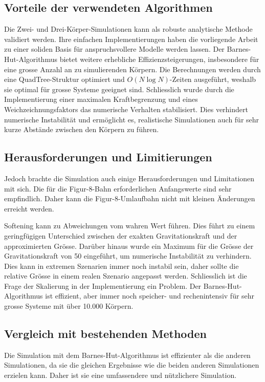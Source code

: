 \documentclass[a4paper,12pt,twoside]{article}
\begin{document}
\subsection{Vorteile der verwendeten Algorithmen}
Die Zwei- und Drei-Körper-Simulationen kann als robuste analytische Methode 
validiert werden. Ihre einfachen Implementierungen haben die vorliegende Arbeit 
zu einer soliden Basis für anspruchsvollere Modelle werden lassen. 
Der Barnes-Hut-Algorithmus bietet weitere erhebliche Effizienzsteigerungen, 
insbesondere für eine grosse Anzahl an zu simulierenden Körpern. 
Die Berechnungen werden durch eine QuadTree-Struktur optimiert 
und $O(N \log N)$-Zeiten ausgeführt, weshalb sie optimal für grosse 
Systeme geeignet sind. Schliesslich wurde durch die Implementierung einer 
maximalen Kraftbegrenzung und eines Weichzeichnungsfaktors das numerische 
Verhalten stabilisiert. Dies verhindert numerische Instabilität und ermöglicht es, 
realistische Simulationen auch für sehr kurze Abstände zwischen den Körpern zu führen. 

\subsection{Herausforderungen und Limitierungen}
Jedoch brachte die Simulation auch einige Herausforderungen und Limitationen 
mit sich. Die für die Figur-8-Bahn erforderlichen Anfangswerte sind sehr empfindlich. 
Daher kann die Figur-8-Umlaufbahn nicht mit kleinen Änderungen erreicht werden. 

Softening kann zu Abweichungen vom wahren Wert führen. Dies führt zu einem 
geringfügigen Unterschied zwischen der exakten Gravitationskraft und der 
approximierten Grösse. Darüber hinaus wurde ein Maximum für die Grösse der 
Gravitationskraft von 50 eingeführt, um numerische Instabilität zu verhindern. 
Dies kann in extremen Szenarien immer noch instabil sein, daher sollte die 
relative Grösse in einem realen Szenario angepasst werden. Schliesslich 
ist die Frage der Skalierung in der Implementierung ein Problem. 
Der Barnes-Hut-Algorithmus ist effizient, aber immer noch speicher- 
und rechenintensiv für sehr grosse Systeme mit über 10.000 Körpern.

\subsection{Vergleich mit bestehenden Methoden}
Die Simulation mit dem Barnes-Hut-Algorithmus ist effizienter als die anderen 
Simulationen, da sie die gleichen Ergebnisse wie die beiden anderen Simulationen 
erzielen kann. Daher ist sie eine umfassendere und nützlichere Simulation.
\end{document}
